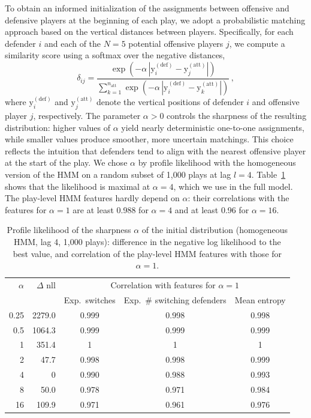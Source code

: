 \documentclass[namedate,webpdf,modern,medium]{oup-authoring-template}
\begin{document}
To obtain an informed initialization of the assignments between offensive and defensive players at the beginning of each play, we adopt a probabilistic matching approach based on the vertical distances between players. Specifically, for each defender \( i \) and each of the \( N = 5 \) potential offensive players \( j \), we compute a similarity score using a softmax over the negative distances,
\[
\delta_{ij} = \frac{\exp(-\alpha \, |\mathrm{y}^{(\text{def})}_i - \mathrm{y}^{(\text{att})}_j|)}{\sum_{k=1}^{n_{\text{att}}} \exp(-\alpha \, |\mathrm{y}^{(\text{def})}_i - \mathrm{y}^{(\text{att})}_k|)} \, ,
\]
where \( \mathrm{y}^{(\text{def})}_i \) and \( \mathrm{y}^{(\text{att})}_j \) denote the vertical positions of defender \( i \) and offensive player \( j \), respectively.  
The parameter \( \alpha > 0 \) controls the sharpness of the resulting distribution: higher values of \( \alpha \) yield nearly deterministic one-to-one assignments, while smaller values produce smoother, more uncertain matchings. This choice reflects the intuition that defenders tend to align with the nearest offensive player at the start of the play. We chose $\alpha$ by profile likelihood with the homogeneous version of the HMM on a random subset of 1,000 plays at lag $l = 4$. Table~\ref{tab:alpha} shows that the likelihood is maximal at $\alpha = 4$, which we use in the full model. The play-level HMM features hardly depend on $\alpha$: their correlations with the features for $\alpha = 1$ are at least 0.988 for $\alpha = 4$ and at least 0.96 for $\alpha = 16$.

\begin{table}[ht]
\centering
\caption{Profile likelihood of the sharpness $\alpha$ of the initial distribution (homogeneous HMM, lag 4, 1,000 plays): difference in the negative log likelihood to the best value, and correlation of the play-level HMM features with those for $\alpha = 1$.}
\label{tab:alpha}
\begin{tabular}{rrccc}
\hline
$\alpha$ & $\Delta$ nll & \multicolumn{3}{c}{Correlation with features for $\alpha = 1$} \\
 & & Exp.\ switches & Exp.\ \# switching defenders & Mean entropy \\
\hline
0.25 & 2279.0 & 0.999 & 0.998 & 0.998 \\
0.5 & 1064.3 & 0.999 & 0.999 & 0.999 \\
1 & 351.4 & 1 & 1 & 1 \\
2 & 47.7 & 0.998 & 0.998 & 0.999 \\
4 & 0 & 0.990 & 0.988 & 0.993 \\
8 & 50.0 & 0.978 & 0.971 & 0.984 \\
16 & 109.9 & 0.971 & 0.961 & 0.976 \\
\hline
\end{tabular}
\end{table}  
\end{document}
